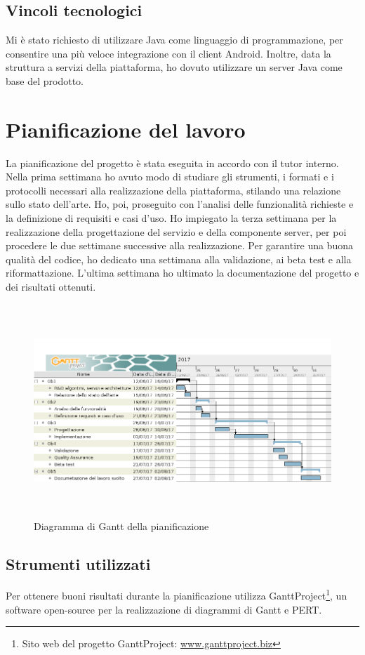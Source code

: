    \subsection{Vincoli tecnologici}
   Mi è stato richiesto di utilizzare Java come linguaggio di programmazione, per consentire una più veloce integrazione con il client Android. Inoltre, data la struttura a servizi della piattaforma, ho dovuto utilizzare un server Java come base del prodotto.

\section{Pianificazione del lavoro}
La pianificazione del progetto è stata eseguita in accordo con il tutor interno. Nella prima settimana ho avuto modo di studiare gli strumenti, i formati e i protocolli necessari alla realizzazione della piattaforma, stilando una relazione sullo stato dell'arte. Ho, poi, proseguito con l'analisi delle funzionalità richieste e la definizione di requisiti e casi d'uso. Ho impiegato la terza settimana per la realizzazione della progettazione del servizio e della componente server, per poi procedere le due settimane successive alla realizzazione. Per garantire una buona qualità del codice, ho dedicato una settimana alla validazione, ai beta test e alla riformattazione. L'ultima settimana ho ultimato la documentazione del progetto e dei risultati ottenuti.
\begin{figure}[H]
   \begin{center}
      \includegraphics[height=8cm,width=15cm,keepaspectratio]{immagini/pianificazione-gantt}
      \caption{Diagramma di Gantt della pianificazione}
   \end{center}
\end{figure}

   \subsection{Strumenti utilizzati}
   Per ottenere buoni risultati durante la pianificazione \nomeAzienda{} utilizza GanttProject\footnote{Sito web del progetto GanttProject: \href{http://www.ganttproject.biz/}{www.ganttproject.biz}}, un software open-source per la realizzazione di diagrammi di \gls{Gantt} e \gls{PERT}.